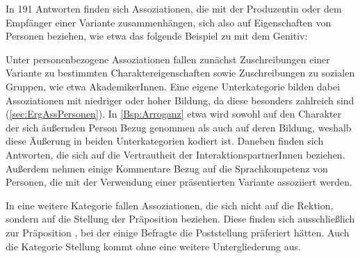 In 191 Antworten finden sich Assoziationen, die mit der Produzentin oder dem Empfänger einer Variante zusammenhängen, sich also auf Eigenschaften von Personen beziehen, wie etwa das folgende Beispiel zu \dank{} mit dem Genitiv: 
\begin{exe}
\ex {} \label{Bsp:Arroganz}
\end{exe}
Unter personenbezogene Assoziationen fallen zunächst Zuschreibungen einer Variante zu bestimmten Charaktereigenschaften sowie Zuschreibungen zu sozialen Gruppen, wie etwa AkademikerInnen.
Eine eigene Unterkategorie bilden dabei Assoziationen mit niedriger oder hoher Bildung, da diese besonders zahlreich sind (\autoref{sec:ErgAssPersonen}). 
In \autoref{Bsp:Arroganz} etwa wird sowohl auf den Charakter der sich äußernden Person Bezug genommen als auch auf deren Bildung, weshalb diese Äußerung in beiden Unterkategorien kodiert ist. 
Daneben finden sich Antworten, die sich auf die Vertrautheit der InteraktionspartnerInnen beziehen. 
Außerdem nehmen einige Kommentare Bezug auf die Sprachkompetenz von Personen, die mit der Verwendung einer präsentierten Variante assoziiert werden. 

In eine weitere Kategorie fallen Assoziationen, die sich nicht auf die Rektion, sondern auf die Stellung der Präposition beziehen. 
Diese finden sich ausschließlich zur Präposition \gegenueber, bei der einige Befragte die Poststellung präferiert hätten.
Auch die Kategorie \glqq Stellung\grqq{} kommt ohne eine weitere Untergliederung aus. 

